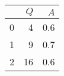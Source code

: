 \begin{tabular}{lrr}
\toprule
{} &  $Q$ &  $A$ \\
\midrule
0 &    4 &  0.6 \\
1 &    9 &  0.7 \\
2 &   16 &  0.6 \\
\bottomrule
\end{tabular}
